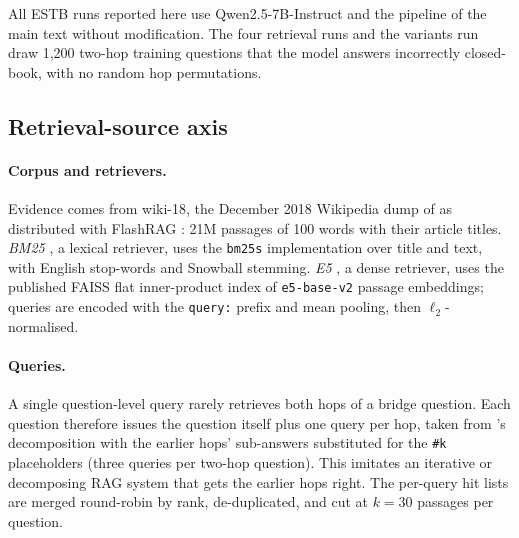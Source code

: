 All ESTB runs reported here use Qwen2.5-7B-Instruct \cite{qwen2025qwen25} and the pipeline of the main text without modification. The four retrieval runs and the variants run draw 1{,}200 two-hop \musique{} training questions that the model answers incorrectly closed-book, with no random hop permutations.

\subsection{Retrieval-source axis}
\label{app:estb-retrieval}

\paragraph{Corpus and retrievers.} Evidence comes from wiki-18, the December 2018 Wikipedia dump of \citet{karpukhin2020dense} as distributed with FlashRAG \cite{jin2025flashrag}: 21M passages of 100 words with their article titles. \emph{BM25} \cite{robertson2009bm25}, a lexical retriever, uses the \texttt{bm25s} implementation \cite{lu2024bm25s} over title and text, with English stop-words and Snowball stemming. \emph{E5} \cite{wang2022e5}, a dense retriever, uses the published FAISS flat inner-product index of \texttt{e5-base-v2} passage embeddings; queries are encoded with the \texttt{query:} prefix and mean pooling, then $\ell_2$-normalised.

\paragraph{Queries.} A single question-level query rarely retrieves both hops of a bridge question. Each question therefore issues the question itself plus one query per hop, taken from \musique{}'s decomposition with the earlier hops' sub-answers substituted for the \texttt{\#k} placeholders (three queries per two-hop question). This imitates an iterative or decomposing RAG system that gets the earlier hops right. The per-query hit lists are merged round-robin by rank, de-duplicated, and cut at $k=30$ passages per question.

